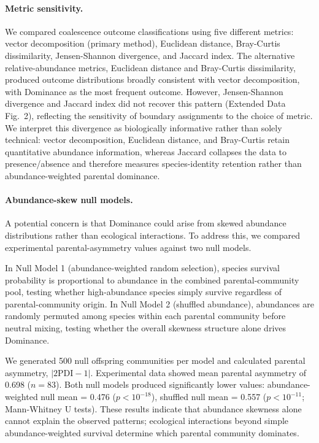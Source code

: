 
\paragraph{Metric sensitivity.}
We compared coalescence outcome classifications using five different metrics: vector decomposition (primary method), Euclidean distance, Bray-Curtis dissimilarity, Jensen-Shannon divergence, and Jaccard index. The alternative relative-abundance metrics, Euclidean distance and Bray-Curtis dissimilarity, produced outcome distributions broadly consistent with vector decomposition, with Dominance as the most frequent outcome. However, Jensen-Shannon divergence and Jaccard index did not recover this pattern (Extended Data Fig.~2), reflecting the sensitivity of boundary assignments to the choice of metric. We interpret this divergence as biologically informative rather than solely technical: vector decomposition, Euclidean distance, and Bray-Curtis retain quantitative abundance information, whereas Jaccard collapses the data to presence/absence and therefore measures species-identity retention rather than abundance-weighted parental dominance.

\paragraph{Abundance-skew null models.}
A potential concern is that Dominance could arise from skewed abundance distributions rather than ecological interactions. To address this, we compared experimental parental-asymmetry values against two null models.

In Null Model 1 (abundance-weighted random selection), species survival probability is proportional to abundance in the combined parental-community pool, testing whether high-abundance species simply survive regardless of parental-community origin. In Null Model 2 (shuffled abundance), abundances are randomly permuted among species within each parental community before neutral mixing, testing whether the overall skewness structure alone drives Dominance.

We generated 500 null offspring communities per model and calculated parental asymmetry, $|2\mathrm{PDI}-1|$. Experimental data showed mean parental asymmetry of 0.698 ($n = 83$). Both null models produced significantly lower values: abundance-weighted null mean = 0.476 ($p < 10^{-18}$), shuffled null mean = 0.557 ($p < 10^{-11}$; Mann-Whitney U tests). These results indicate that abundance skewness alone cannot explain the observed patterns; ecological interactions beyond simple abundance-weighted survival determine which parental community dominates.

